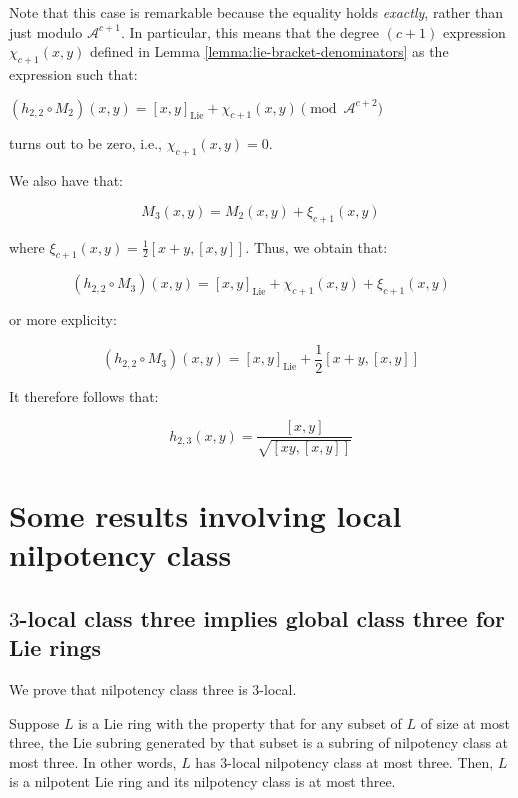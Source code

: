 Note that this case is remarkable because the equality holds {\em
  exactly}, rather than just modulo $\mathcal{A}^{c+1}$. In
particular, this means that the degree $(c + 1)$ expression
$\chi_{c+1}(x,y)$ defined in Lemma
\ref{lemma:lie-bracket-denominators} as the expression such that:

$(h_{2,2} \circ M_2)(x,y) = [x,y]_{\text{Lie}} + \chi_{c+1}(x,y) \pmod{\mathcal{A}^{c+2}}$

turns out to be zero, i.e., $\chi_{c+1}(x,y) = 0$.

We also have that:

$$M_3(x,y) = M_2(x,y) + \xi_{c+1}(x,y)$$

where $\xi_{c+1}(x,y) = \frac{1}{2}[x + y,[x,y]]$. Thus, we obtain that:

$$(h_{2,2} \circ M_3)(x,y) = [x,y]_{\text{Lie}} + \chi_{c+1}(x,y) + \xi_{c+1}(x,y)$$

or more explicity:

$$(h_{2,2} \circ M_3)(x,y) = [x,y]_{\text{Lie}} + \frac{1}{2}[x + y,[x,y]]$$

It therefore follows that:

$$h_{2,3}(x,y) = \frac{[x,y]}{\sqrt{[xy,[x,y]]}}$$


\section{Some results involving local nilpotency class}


\subsection{$3$-local class three implies global class three for Lie rings}\label{appsec:3-local-class-three-implies-global-class-three}

We prove that nilpotency class three is $3$-local.

\begin{lemma}
  Suppose $L$ is a Lie ring with the property that for any subset of
  $L$ of size at most three, the Lie subring generated by that subset
  is a subring of nilpotency class at most three. In other words, $L$
  has $3$-local nilpotency class at most three. Then, $L$ is a
  nilpotent Lie ring and its nilpotency class is at most three.
\end{lemma}

